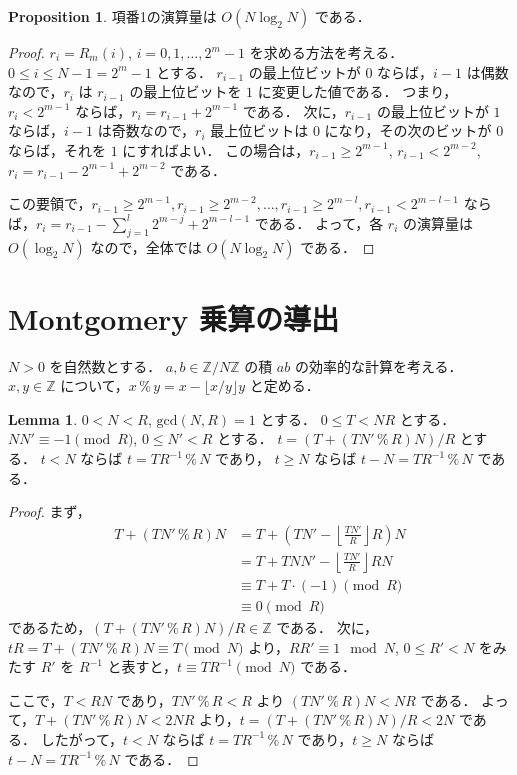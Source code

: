 \documentclass[twocolumn, uplatex, dvipdfmx]{jsarticle}
\renewcommand{\ge}{\geqslant}
\renewcommand{\le}{\leqslant}
\numberwithin{equation}{section}
\theoremstyle{definition}
\newtheorem{prop}{Proposition}[section]
\newtheorem{lem}{Lemma}[section]
\newcommand{\Mod}{\,\texttt{\%}\,}
\begin{document}
\begin{prop}
	項番1の演算量は $O(N\log_2N)$ である．
\end{prop}
\begin{proof}
	$r_i=R_m(i)$, $i=0,1,\dots,2^m-1$ を求める方法を考える．
	$0\le i\le N-1=2^m-1$ とする．
	$r_{i-1}$ の最上位ビットが $0$ ならば，$i-1$ は偶数なので，$r_i$ は $r_{i-1}$ の最上位ビットを $1$ に変更した値である．
	つまり，$r_i<2^{m-1}$ ならば，$r_i=r_{i-1}+2^{m-1}$ である．
	次に，$r_{i-1}$ の最上位ビットが $1$ ならば，$i-1$ は奇数なので，$r_i$ 最上位ビットは $0$ になり，その次のビットが $0$ ならば，それを $1$ にすればよい．
	この場合は，$r_{i-1}\ge 2^{m-1}$, $r_{i-1}<2^{m-2}$, $r_i=r_{i-1}-2^{m-1}+2^{m-2}$ である．

	この要領で，$r_{i-1}\ge 2^{m-1},r_{i-1}\ge2^{m-2},\dots,r_{i-1}\ge2^{m-l},r_{i-1}<2^{m-l-1}$ ならば，$r_i=r_{i-1}-\sum_{j=1}^l2^{m-j}+2^{m-l-1}$ である．
	よって，各 $r_i$ の演算量は $O(\log_2N)$ なので，全体では $O(N\log_2N)$ である．
\end{proof}

\section{Montgomery 乗算の導出}

$N>0$ を自然数とする．
$a,b\in\mathbb{Z}/N\mathbb{Z}$ の積 $ab$ の効率的な計算を考える．
$x,y\in\mathbb{Z}$ について，$x\Mod y=x-\lfloor x/y\rfloor y$ と定める．

\begin{lem}
	$0<N<R$, $\mathrm{gcd}(N,R)=1$ とする．
	$0\le T<NR$ とする．
	$NN'\equiv-1\pmod{R}$, $0\le N'<R$ とする．
	$t=(T+(TN'\Mod R)N)/R$ とする．
	$t<N$ ならば $t=TR^{-1}\Mod N$ であり，
	$t\ge N$ ならば $t-N=TR^{-1}\Mod N$ である．
\end{lem}
\begin{proof}
	まず，
	\begin{align*}
		T+(TN'\Mod R)N&=T+\left(TN'-\left\lfloor\frac{TN'}{R}\right\rfloor R\right)N\\
		&=T+TNN'-\left\lfloor\frac{TN'}{R}\right\rfloor RN\\
		&\equiv T+T\cdot(-1)\pmod{R}\\
		&\equiv0\pmod{R}
	\end{align*}
	であるため，$(T+(TN'\Mod R)N)/R\in\mathbb{Z}$ である．
	次に，$tR=T+(TN'\Mod R)N\equiv T\pmod{N}$ より，$RR'\equiv1\mod{N}$, $0\le R'<N$ をみたす $R'$ を $R^{-1}$ と表すと，$t\equiv TR^{-1}\pmod{N}$ である．

	ここで，$T<RN$ であり，$TN'\Mod R<R$ より $(TN'\Mod R)N<NR$ である．
	よって，$T+(TN'\Mod R)N<2NR$ より，$t=(T+(TN'\Mod R)N)/R<2N$ である．
	したがって，$t<N$ ならば $t=TR^{-1}\Mod N$ であり，$t\ge N$ ならば $t-N=TR^{-1}\Mod N$ である．
\end{proof}
\end{document}
